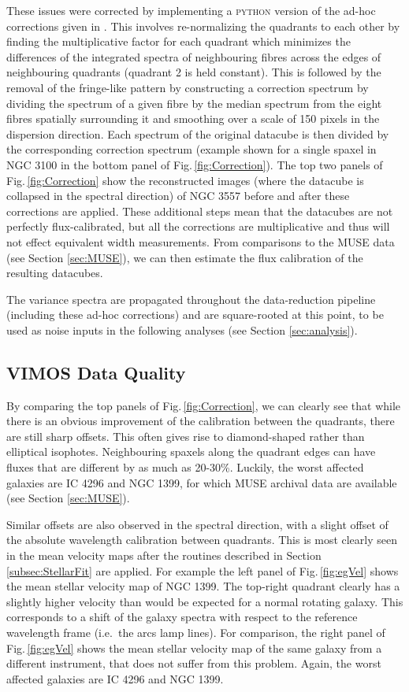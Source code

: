 		These issues were corrected by implementing a \textsc{python} version of the ad-hoc corrections given in \citet{Lagerholm2012}. This involves re-normalizing the quadrants to each other by finding the multiplicative factor for each quadrant which minimizes the differences of the integrated spectra of neighbouring fibres across the edges of neighbouring quadrants (quadrant 2 is held constant). This is followed by the removal of the fringe-like pattern by constructing a correction spectrum by dividing the spectrum of a given fibre by the median spectrum from the eight fibres spatially surrounding it and smoothing over a scale of 150 pixels in the dispersion direction. Each spectrum of the original datacube is then divided by the corresponding correction spectrum (example shown for a single spaxel in NGC 3100 in the bottom panel of Fig.\,\ref{fig:Correction}). The top two panels of Fig.\,\ref{fig:Correction} show the reconstructed images (where the datacube is collapsed in the spectral direction) of NGC 3557 before and after these corrections are applied. These additional steps mean that the datacubes are not perfectly flux-calibrated, but all the corrections are multiplicative and thus will not effect equivalent width measurements. From comparisons to the MUSE data (see Section \ref{sec:MUSE}), we can then estimate the flux calibration of the resulting datacubes. 

		The variance spectra are propagated throughout the data-reduction pipeline (including these ad-hoc corrections) and are square-rooted at this point, to be used as noise inputs in the following analyses (see Section \ref{sec:analysis}).

	\subsection{VIMOS Data Quality}
		\label{subsec:VIMOSartefacts}
		By comparing the top panels of Fig.\,\ref{fig:Correction}, we can clearly see that while there is an obvious improvement of the calibration between the quadrants, there are still sharp offsets. This often gives rise to diamond-shaped rather than elliptical isophotes. Neighbouring spaxels along the quadrant edges can have fluxes that are different by as much as 20-30\%. Luckily, the worst affected galaxies are IC 4296 and NGC 1399, for which MUSE archival data are available (see Section \ref{sec:MUSE}). 

		Similar offsets are also observed in the spectral direction, with a slight offset of the absolute wavelength calibration between quadrants. This is most clearly seen in the mean velocity maps after the routines described in Section \ref{subsec:StellarFit} are applied. For example the left panel of Fig.\,\ref{fig:egVel} shows the mean stellar velocity map of NGC 1399. The top-right quadrant clearly has a slightly higher velocity than would be expected for a normal rotating galaxy. This corresponds to a shift of the galaxy spectra with respect to the reference wavelength frame (i.e.\ the arcs lamp lines). For comparison, the right panel of Fig.\,\ref{fig:egVel} shows the mean stellar velocity map of the same galaxy from a different instrument, that does not suffer from this problem. Again, the worst affected galaxies are IC 4296 and NGC 1399.

